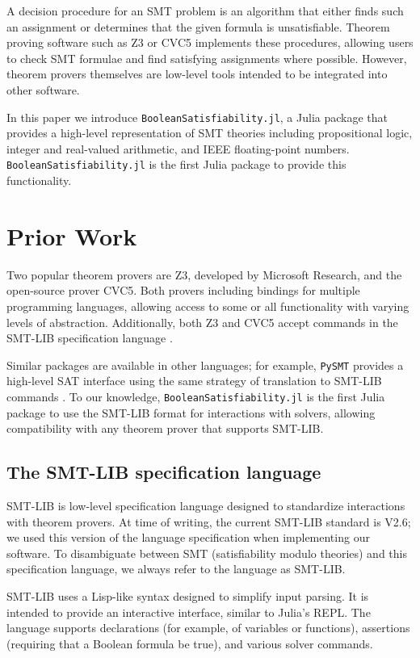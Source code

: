 \documentclass[conference]{IEEEtran}
\begin{document}
A decision procedure for an SMT problem is an algorithm that either finds such an assignment or determines that the given formula is unsatisfiable.  Theorem proving software such as Z3 or CVC5 \cite{z3, cvc5}
implements these procedures, allowing users to check SMT formulae and find satisfying assignments where possible. However, theorem provers themselves are low-level tools intended to be integrated into other software.

In this paper we introduce \verb|BooleanSatisfiability.jl|, a Julia package that provides a high-level representation of SMT theories including propositional logic, integer and real-valued arithmetic, and IEEE floating-point numbers. \verb|BooleanSatisfiability.jl| is the first Julia package to provide this functionality.

\section{Prior Work}
Two popular theorem provers are Z3, developed by Microsoft Research, and the open-source prover CVC5. Both provers including bindings for multiple programming languages, allowing access to some or all functionality with varying levels of abstraction. Additionally, both Z3 and CVC5 accept commands in the SMT-LIB specification language \cite{smtlib2}.

Similar packages are available in other languages; for example, \verb|PySMT| provides a high-level SAT interface using the same strategy of translation to SMT-LIB commands \cite{pysmt2015}.
To our knowledge, \verb|BooleanSatisfiability.jl| is the first Julia package to use the SMT-LIB format for interactions with solvers, allowing compatibility with any theorem prover that supports SMT-LIB.

\subsection{The SMT-LIB specification language}
SMT-LIB is low-level specification language designed to standardize interactions with theorem provers. At time of writing, the current SMT-LIB standard is V2.6; we used this version of the language specification when implementing our software. To disambiguate between SMT (satisfiability modulo theories) and this specification language, we always refer to the language as SMT-LIB.

SMT-LIB uses a Lisp-like syntax designed to simplify input parsing. It is intended to provide an interactive interface, similar to Julia's REPL. The language supports declarations (for example, of variables or functions), assertions (requiring that a Boolean formula be true), and various solver commands.
\end{document}
